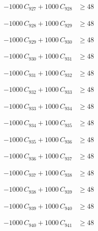 \documentclass[a4paper,11pt]{article}
\begin{document}
\begin{align}
-1000\,C_{927} + 1000\,C_{928} &\geq 48 \nonumber
\end{align}

\begin{align}
-1000\,C_{928} + 1000\,C_{929} &\geq 48 \nonumber
\end{align}

\begin{align}
-1000\,C_{929} + 1000\,C_{930} &\geq 48 \nonumber
\end{align}

\begin{align}
-1000\,C_{930} + 1000\,C_{931} &\geq 48 \nonumber
\end{align}

\begin{align}
-1000\,C_{931} + 1000\,C_{932} &\geq 48 \nonumber
\end{align}

\begin{align}
-1000\,C_{932} + 1000\,C_{933} &\geq 48 \nonumber
\end{align}

\begin{align}
-1000\,C_{933} + 1000\,C_{934} &\geq 48 \nonumber
\end{align}

\begin{align}
-1000\,C_{934} + 1000\,C_{935} &\geq 48 \nonumber
\end{align}

\begin{align}
-1000\,C_{935} + 1000\,C_{936} &\geq 48 \nonumber
\end{align}

\begin{align}
-1000\,C_{936} + 1000\,C_{937} &\geq 48 \nonumber
\end{align}

\begin{align}
-1000\,C_{937} + 1000\,C_{938} &\geq 48 \nonumber
\end{align}

\begin{align}
-1000\,C_{938} + 1000\,C_{939} &\geq 48 \nonumber
\end{align}

\begin{align}
-1000\,C_{939} + 1000\,C_{940} &\geq 48 \nonumber
\end{align}

\begin{align}
-1000\,C_{940} + 1000\,C_{941} &\geq 48 \nonumber
\end{align}
\end{document}
